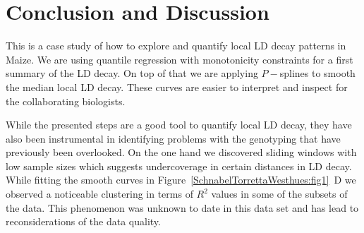 \documentclass[twoside]{report}
\begin{document}

\section{Conclusion and Discussion}
This is a case study of how to explore and quantify local LD decay patterns in Maize. We are using
quantile regression with monotonicity constraints for a first summary of the LD decay. 
On top of that we are applying $P-$splines to smooth the median local LD decay. These curves 
are easier to interpret and inspect for the collaborating biologists. 

While the presented steps are a good tool to quantify local LD decay, they have also been 
	instrumental in identifying problems with the genotyping that have previously been 
	overlooked. On the one hand we discovered sliding windows with low sample sizes which suggests 
	undercoverage in certain distances in LD decay. 
	While fitting the smooth curves in Figure~\ref{SchnabelTorrettaWesthues:fig1}~D we observed a noticeable clustering 
	in terms of $R^2$ values in some of the subsets of the data. This phenomenon was unknown 
	to date in this data set and has lead to reconsiderations of the data quality.

\end{document}
